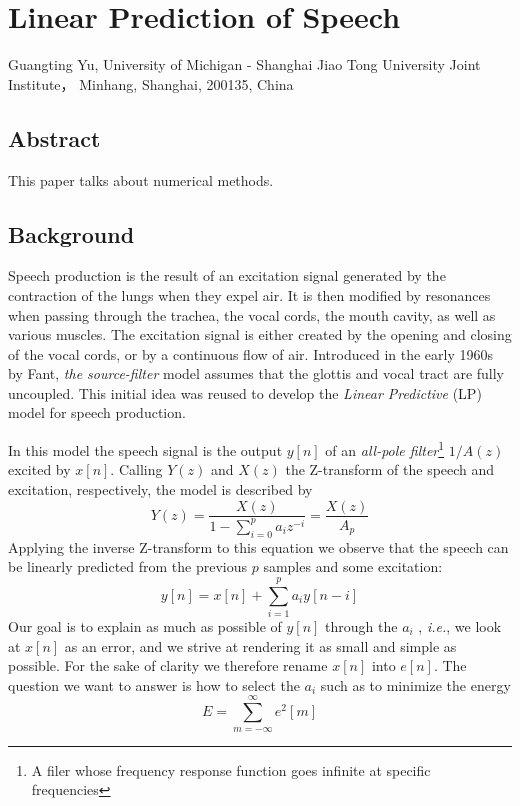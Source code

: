 \renewcommand{\thesection}{\arabic{section}}
\titleformat{\section}{\normalfont\large\bfseries}{\thesection}{1em}{}
\renewcommand{\chaptername}{Project}
\setcounter{chapter}{0}


\chapter{Linear Prediction of Speech}
\begin{center}
Guangting Yu, University of Michigan - Shanghai Jiao Tong University Joint Institute， Minhang, Shanghai, 200135, China
\end{center}


\section*{Abstract}
This paper talks about numerical methods.



\section{Background}
Speech production is the result of an excitation signal generated by the contraction of the lungs when they expel air.\cite{dutoit}
It is then modified by resonances when passing through the trachea, the vocal cords, the mouth cavity, as well as various muscles.\cite{tam59}
The excitation signal is either created by the opening and closing of the vocal cords, or by a continuous flow of air.\cite{gtm181}
Introduced in the early 1960s by Fant, \textit{the source-filter} model assumes that the glottis and vocal tract are fully uncoupled.\cite{corless}
This initial idea was reused to develop the \textit{Linear Predictive} (LP) model for speech production.\cite{tam39}

In this model the speech signal is the output \(y[n]\) of an \textit{all-pole filter}\footnote{A filer whose frequency response function goes infinite at specific frequencies} \(1/A(z)\) excited by \(x[n]\).\cite{golan}
Calling \(Y(z)\) and \(X(z)\) the Z-transform of the speech and excitation, respectively, the model is described by\cite{utm}
\[ Y(z)=\frac{X(z)}{1-\sum_{i=0}^p a_i z^{-i}}=\frac{X(z)}{A_p} \]
Applying the inverse Z-transform to this equation we observe that the speech can be linearly predicted from the previous $p$ samples and some excitation:
\[ y[n] = x[n]+\sum_{i=1}^p a_i y[n-i] \]
Our goal is to explain as much as possible of \(y[n]\) through the $a_i$ , \textit{i.e.}, we look at \(x[n]\) as an error, and we strive at rendering it as small and simple as possible.\cite{gtm135}
For the sake of clarity we therefore rename \(x[n]\) into \(e[n]\).\cite{cc12}
The question we want to answer is how to select the $a_i$ such as to minimize the energy
\[ E=\sum_{m=-\infty}^\infty e^2[m] \]

